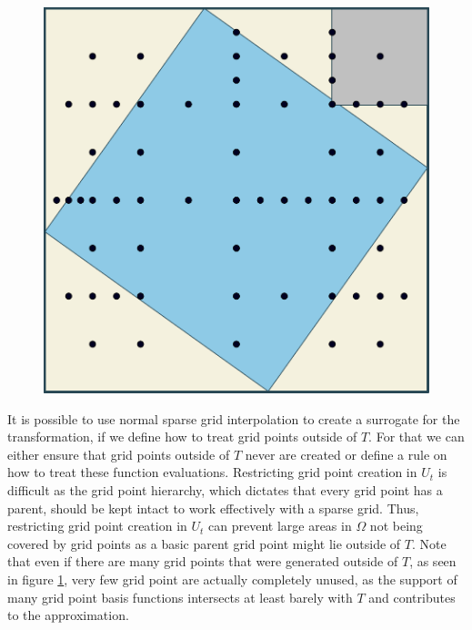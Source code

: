 \documentclass[
  a4paper,  %
  twoside,  %
  bibliography=totoc,
  headsepline,
  cleardoublepage=empty,
  parskip=half,
  draft=false
]{scrbook}
\begin{document}
\begin{mdframed}[style=style]
\begin{figure}[H]
        \centering
\begin{minipage}{.49\textwidth}
        \centering
\label{fig:aligned_grid}
    \end{minipage}%
    \begin{minipage}{0.49\textwidth}
        \centering
   \includegraphics[width=0.8\linewidth]{graphics/aligned_grid}
    \end{minipage}
\end{figure}
\end{mdframed}
%
It is possible to use normal sparse grid interpolation to create a surrogate for the transformation, if we define how to treat grid points outside of $T$.
For that we can either ensure that grid points outside of $T$ never are created or define a rule on how to treat these function evaluations.
Restricting grid point creation in $U_t$ is difficult as the grid point hierarchy, which dictates that every grid point has a parent, should be kept intact to work effectively with a sparse grid.
Thus, restricting grid point creation in $U_t$ can prevent large areas in $\Omega$ not being covered by grid points as a basic parent grid point might lie outside of $T$.
Note that even if there are many grid points that were generated outside of $T$, as seen in figure \cref{fig:aligned_grid}, very few grid point are actually completely unused, as the support of many grid point basis functions intersects at least barely with $T$ and contributes to the approximation.
\end{document}
